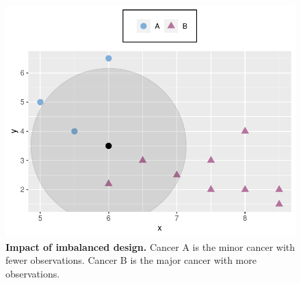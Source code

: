 \begin{figure}[h!]
    \centering
    \includegraphics[scale=1]{graphics/imbalanced.pdf}
    \caption{\textbf{Impact of imbalanced design.} Cancer A is the minor cancer with fewer observations. Cancer B is the major cancer with more observations. }
    \label{fig:imbalanced}
\end{figure}
